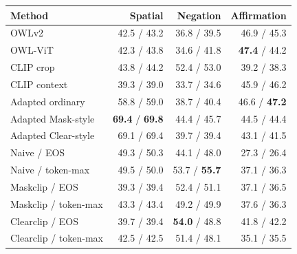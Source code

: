\begin{tabular}{lrrr}\toprule
Method & Spatial & Negation & Affirmation \\
\midrule
OWLv2 & 42.5 / 43.2 & 36.8 / 39.5 & 46.9 / 45.3 \\
OWL-ViT & 42.3 / 43.8 & 34.6 / 41.8 & \textbf{47.4} / 44.2 \\
CLIP crop & 43.8 / 44.2 & 52.4 / 53.0 & 39.2 / 38.3 \\
CLIP context & 39.3 / 39.0 & 33.7 / 34.6 & 45.9 / 46.2 \\
Adapted ordinary & 58.8 / 59.0 & 38.7 / 40.4 & 46.6 / \textbf{47.2} \\
Adapted Mask-style & \textbf{69.4} / \textbf{69.8} & 44.4 / 45.7 & 44.5 / 44.4 \\
Adapted Clear-style & 69.1 / 69.4 & 39.7 / 39.4 & 43.1 / 41.5 \\
Naive / EOS & 49.3 / 50.3 & 44.1 / 48.0 & 27.3 / 26.4 \\
Naive / token-max & 49.5 / 50.0 & 53.7 / \textbf{55.7} & 37.1 / 36.3 \\
Maskclip / EOS & 39.3 / 39.4 & 52.4 / 51.1 & 37.1 / 36.5 \\
Maskclip / token-max & 43.3 / 43.4 & 49.2 / 49.9 & 37.6 / 36.3 \\
Clearclip / EOS & 39.7 / 39.4 & \textbf{54.0} / 48.8 & 41.8 / 42.2 \\
Clearclip / token-max & 42.5 / 42.5 & 51.4 / 48.1 & 35.1 / 35.5 \\
\bottomrule\end{tabular}